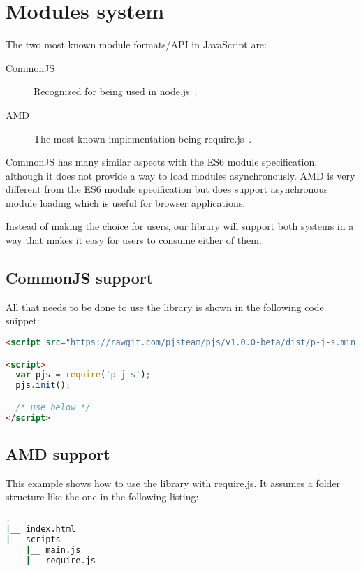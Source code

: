 \section{Modules system}


The two most known module formats/API in JavaScript are:
\begin{description}
\item[CommonJS] Recognized for being used in node.js~\cite{nodejs}.
\item[AMD~\cite{amd}] The most known implementation being require.js~\cite{requirejs}.
\end{description}

CommonJS has many similar aspects with the ES6 module specification, although it does not provide a way to load modules asynchronously. AMD is very different from the ES6 module specification but does support asynchronous module loading which is useful for browser applications.

Instead of making the choice for users, our library will support both systems in a way that makes it easy for users to consume either of them.

\subsection{CommonJS support}
All that needs to be done to use the library is shown in the following code snippet:
\begin{lstlisting}[language=HTML, caption=CommonJS usage]
<script src="https://rawgit.com/pjsteam/pjs/v1.0.0-beta/dist/p-j-s.min.js"></script>

<script>
  var pjs = require('p-j-s');
  pjs.init();

  /* use below */
</script>
\end{lstlisting}

\subsection{AMD support}
This example shows how to use the library with require.js. It assumes a folder structure like the one in the following listing:
\begin{lstlisting}[language=bash, caption=AMD folder structure]
.
|__ index.html
|__ scripts
    |__ main.js
    |__ require.js
\end{lstlisting}

